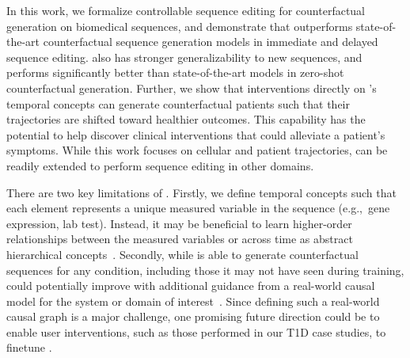 
In this work, we formalize controllable sequence editing for counterfactual generation on biomedical sequences, and demonstrate that \name outperforms state-of-the-art counterfactual sequence generation models in immediate and delayed sequence editing. \name also has stronger generalizability to new sequences, and performs significantly better than state-of-the-art models in zero-shot counterfactual generation. Further, we show that interventions directly on \name's temporal concepts can generate counterfactual patients such that their trajectories are shifted toward healthier outcomes. This capability has the potential to help discover clinical interventions that could alleviate a patient's symptoms. While this work focuses on cellular and patient trajectories, \name can be readily extended to perform sequence editing in other domains.



%
There are two key limitations of \name. Firstly, we define temporal concepts such that each element represents a unique measured variable in the sequence (e.g.,~gene expression, lab test). Instead, it may be beneficial to learn higher-order relationships between the measured variables or across time as abstract hierarchical concepts~\cite{the2024large, kacprzyk2024towards}. Secondly, while \name is able to generate counterfactual sequences for any condition, including those it may not have seen during training, \name could potentially improve with additional guidance from a real-world causal model for the system or domain of interest~\cite{chatzi2024counterfactual}. Since defining such a real-world causal graph is a major challenge, one promising future direction could be to enable user interventions, such as those performed in our T1D case studies, to finetune \name.
